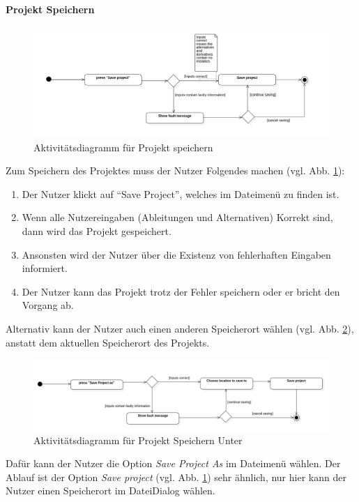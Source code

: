 \documentclass{article}
\begin{document}
\paragraph{Projekt Speichern}\mbox{}
\begin{figure}[H]%
    \centering
    \includegraphics[width=13cm]{entwurf/Entwurf_dokument/img/Alissa/SaveProjectAD.png}
    \caption{Aktivitätsdiagramm für Projekt speichern}
    \label{ADProjekt Speichern}
\end{figure}
Zum Speichern des Projektes muss der Nutzer Folgendes machen (vgl. Abb. \ref{ADProjekt Speichern}):
\begin{enumerate}
    \item[1.] Der Nutzer klickt auf \enquote{Save Project}, welches im Dateimenü zu finden ist.
    \item[2.] Wenn alle Nutzereingaben (Ableitungen und Alternativen) Korrekt sind, dann wird das Projekt gespeichert.
    \item[3.] Ansonsten wird der Nutzer über die Existenz von fehlerhaften Eingaben informiert.
    \item[3.] Der Nutzer kann das Projekt trotz der Fehler speichern oder er bricht den Vorgang ab.
\end{enumerate}
Alternativ kann der Nutzer auch einen anderen Speicherort wählen (vgl. Abb. \ref{ADProkjektSpeichernAls}), anstatt dem aktuellen Speicherort des Projekts.

\begin{figure}[H]%
    \centering
    \includegraphics[width=13cm]{entwurf/Entwurf_dokument/img/Alissa/SaveProjectAsAD.png}
    \caption{Aktivitätsdiagramm für Projekt Speichern Unter}
    \label{ADProkjektSpeichernAls}
\end{figure}
Dafür kann der Nutzer die Option \textit{Save Project As} im Dateimenü wählen. Der Ablauf ist der Option \textit{Save project} (vgl. Abb. \ref{ADProjekt Speichern}) sehr ähnlich, nur hier kann der Nutzer einen Speicherort im Datei\textendash Dialog wählen.
\\\\
\end{document}
